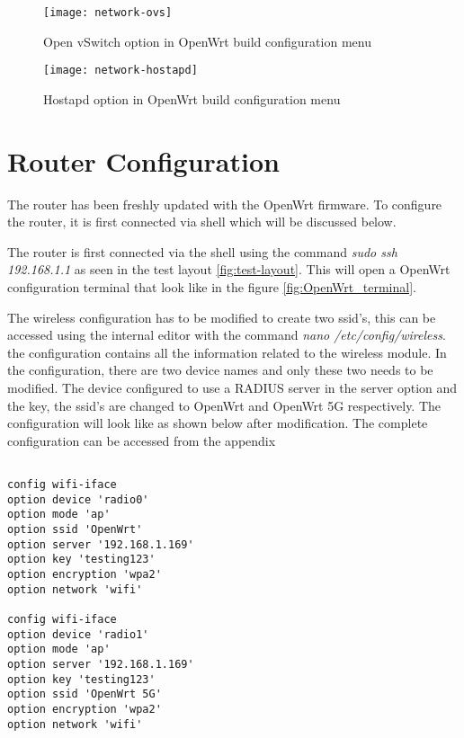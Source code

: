   \begin{figure}[H]
 	\centering
 	\texttt{[image: network-ovs]}
 	\caption {Open vSwitch option in OpenWrt build configuration menu}
 	\label{fig:openvswitch}
 	\vspace{-10pt}
 \end{figure}

 \begin{figure}[H]
	\centering
	\texttt{[image: network-hostapd]}
	\caption {Hostapd option in OpenWrt build configuration menu}
	\label{fig:hostapd}
	\vspace{-10pt}
\end{figure}
\section{Router Configuration}
The router has been freshly updated with the OpenWrt firmware. To configure the router, it is first connected via shell which will be discussed below.

The router is first connected via the shell using the command \textit{sudo ssh 192.168.1.1} as seen in the test layout \ref{fig:test-layout}. This will open a OpenWrt configuration terminal that look like in the figure \ref{fig:OpenWrt_terminal}.

The wireless configuration has to be modified to create two ssid's, this can be accessed using the internal editor with the command \textit{nano /etc/config/wireless}. the configuration contains all the information related to the wireless module. In the configuration, there are two device names and only these two needs to be modified. The device configured to use a RADIUS server in the server option and the key, the ssid's are changed to OpenWrt and OpenWrt 5G respectively. The configuration will look like as shown below after modification. The complete configuration can be accessed from the appendix 

	\begin{lstlisting}

config wifi-iface
option device 'radio0'
option mode 'ap'
option ssid 'OpenWrt'
option server '192.168.1.169'
option key 'testing123'
option encryption 'wpa2'
option network 'wifi'

config wifi-iface
option device 'radio1'
option mode 'ap'
option server '192.168.1.169'
option key 'testing123'
option ssid 'OpenWrt 5G'
option encryption 'wpa2'
option network 'wifi'
\end{lstlisting}

